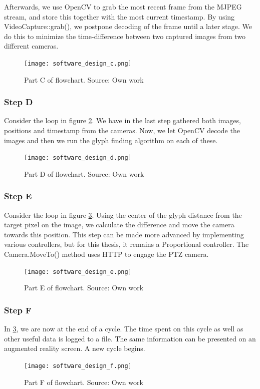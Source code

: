 Afterwards, we use OpenCV to grab the most recent frame from the MJPEG stream, and store this together with the most current timestamp. By using VideoCapture::grab(), we postpone decoding of the frame until a later stage. We do this to minimize the time-difference between two captured images from two different cameras.

\begin{figure}[ht]
    \centering
    \texttt{[image: software\_design\_c.png]}
    \caption{Part C of flowchart. Source: Own work}
    \label{fig:software_design_c}
\end{figure}
\FloatBarrier


\subsubsection{Step D}
Consider the loop in figure \ref{fig:software_design_d}. We have in the last step gathered both images, positions and timestamp from the cameras. Now, we let OpenCV decode the images and then we run the glyph finding algorithm on each of these.
\begin{figure}[ht]
    \centering
    \texttt{[image: software\_design\_d.png]}
    \caption{Part D of flowchart. Source: Own work}
    \label{fig:software_design_d}
\end{figure}
\FloatBarrier

\subsubsection{Step E}
Consider the loop in figure \ref{fig:software_design_e}. Using the center of the glyph distance from the target pixel on the image, we calculate the difference and move the camera towards this position. This step can be made more advanced by implementing various controllers, but for this thesis, it remains a Proportional controller. The Camera.MoveTo() method uses HTTP to engage the PTZ camera.
\begin{figure}[ht]
    \centering
    \texttt{[image: software\_design\_e.png]}
    \caption{Part E of flowchart. Source: Own work}
    \label{fig:software_design_e}
\end{figure}
\FloatBarrier

\subsubsection{Step F}
In \ref{fig:software_design_e}, we are now at the end of a cycle. The time spent on this cycle as well as other useful data is logged to a file. The same information can be presented on an augmented reality screen. A new cycle begins.
\begin{figure}[ht]
    \centering
    \texttt{[image: software\_design\_f.png]}
    \caption{Part F of flowchart. Source: Own work}
    \label{fig:software_design_f}
\end{figure}
\FloatBarrier

